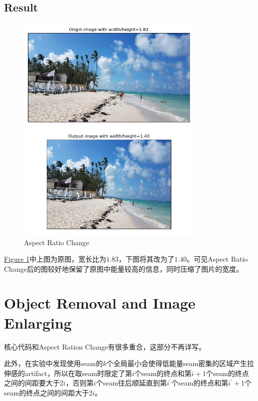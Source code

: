 \documentclass[UTF8]{ctexart}
\begin{document}
	\subsection{Result}
	
	\begin{figure}[htbp]
		\centering
		\includegraphics[width=0.8\textwidth]{../output1.png}
		\caption{Aspect Ratio Change}
		\label{Fig.output1}
	\end{figure}

	\hyperref[Fig.output1]{Figure 1}中上图为原图，宽长比为$1.83$，下图将其改为了$1.40$。可见Aspect Ratio Change后的图较好地保留了原图中能量较高的信息，同时压缩了图片的宽度。
	
	\section{Object Removal and Image Enlarging}
	核心代码和Aspect Ration Change有很多重合，这部分不再详写。
	
	此外，在实验中发现使用seam的$k$个全局最小会使得低能量seam密集的区域产生拉伸感的artifact，所以在取seam时限定了第$i$个seam的终点和第$i+1$个seam的终点之间的间距要大于$2i$，否则第$i$个seam往后顺延直到第$i^{'}$个seam的终点和第$i^{'}+1$个seam的终点之间的间距大于$2i$。
\end{document}
